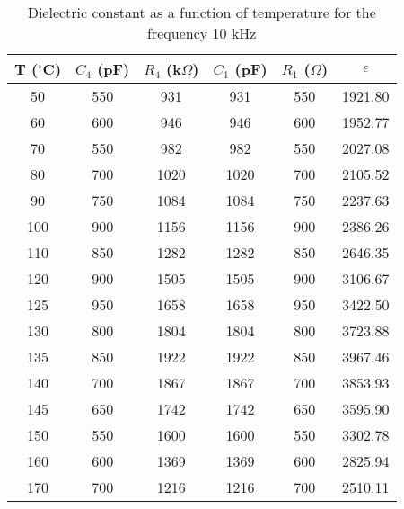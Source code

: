 \begin{table}[H]
    \centering
    \begin{tabular}{|c|c|c|c|c|c|}
    \hline
    T ($^\circ$C) & $C_4$ (pF) & $R_4$ (k$\Omega$) & $C_1$ (pF) & $R_1$ ($\Omega$) & $\epsilon$ \\ \hline
    50 & 550 & 931 & 931 & 550 & 1921.80 \\ \hline
    60 & 600 & 946 & 946 & 600 & 1952.77 \\ \hline
    70 & 550 & 982 & 982 & 550 & 2027.08 \\ \hline
    80 & 700 & 1020 & 1020 & 700 & 2105.52 \\ \hline
    90 & 750 & 1084 & 1084 & 750 & 2237.63 \\ \hline
    100 & 900 & 1156 & 1156 & 900 & 2386.26 \\ \hline
    110 & 850 & 1282 & 1282 & 850 & 2646.35 \\ \hline
    120 & 900 & 1505 & 1505 & 900 & 3106.67 \\ \hline
    125 & 950 & 1658 & 1658 & 950 & 3422.50 \\ \hline
    130 & 800 & 1804 & 1804 & 800 & 3723.88 \\ \hline
    135 & 850 & 1922 & 1922 & 850 & 3967.46 \\ \hline
    140 & 700 & 1867 & 1867 & 700 & 3853.93 \\ \hline
    145 & 650 & 1742 & 1742 & 650 & 3595.90 \\ \hline
    150 & 550 & 1600 & 1600 & 550 & 3302.78 \\ \hline
    160 & 600 & 1369 & 1369 & 600 & 2825.94 \\ \hline
    170 & 700 & 1216 & 1216 & 700 & 2510.11 \\ \hline
    \end{tabular}
    \caption{Dielectric constant as a function
    of temperature for the frequency 10 kHz}
    \label{tab:f1}
\end{table} 
